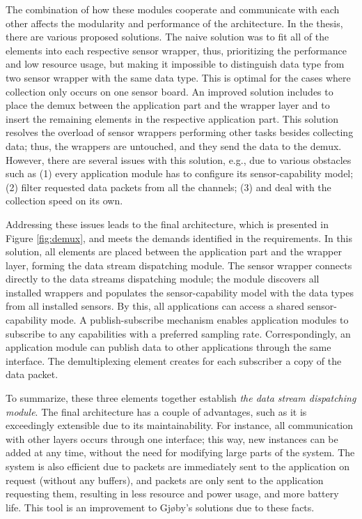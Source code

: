 The combination of how these modules cooperate and communicate with each other affects the modularity and performance of the architecture. In the thesis, there are various proposed solutions. The naive solution was to fit all of the elements into each respective sensor wrapper, thus, prioritizing the performance and low resource usage, but making it impossible to distinguish data type from two sensor wrapper with the same data type. This is optimal for the cases where collection only occurs on one sensor board. An improved solution includes to place the demux between the application part and the wrapper layer and to insert the remaining elements in the respective application part. This solution resolves the overload of sensor wrappers performing other tasks besides collecting data; thus, the wrappers are untouched, and they send the data to the demux. However, there are several issues with this solution, e.g., due to various obstacles such as (1) every application module has to configure its sensor-capability model; (2) filter requested data packets from all the channels; (3) and deal with the collection speed on its own.

Addressing these issues leads to the final architecture, which is presented in Figure \ref{fig:demux}, and meets the demands identified in the requirements. In this solution, all elements are placed between the application part and the wrapper layer, forming the data stream dispatching module. The sensor wrapper connects directly to the data streams dispatching module; the module discovers all installed wrappers and populates the sensor-capability model with the data types from all installed sensors. By this, all applications can access a shared sensor-capability mode. A publish-subscribe mechanism enables application modules to subscribe to any capabilities with a preferred sampling rate. Correspondingly, an application module can publish data to other applications through the same interface. The demultiplexing element creates for each subscriber a copy of the data packet. 

To summarize, these three elements together establish \textit{the data stream dispatching module}. The final architecture has a couple of advantages, such as it is exceedingly extensible due to its maintainability. For instance, all communication with other layers occurs through one interface; this way, new instances can be added at any time, without the need for modifying large parts of the system. The system is also efficient due to packets are immediately sent to the application on request (without any buffers), and packets are only sent to the application requesting them, resulting in less resource and power usage, and more battery life. This tool is an improvement to Gjøby's solutions due to these facts.

